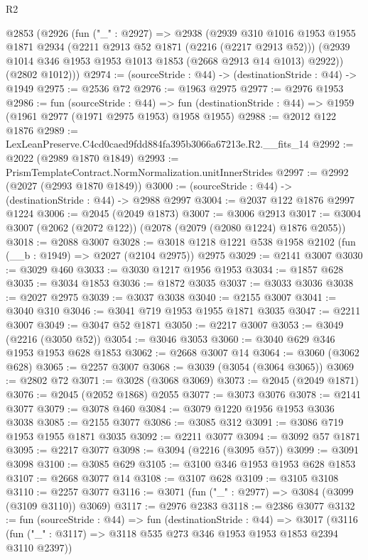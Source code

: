 \begin{lexlean}{R2}
\begin{coremodule}
  @2853
    (@2926
      (fun ("_" : @2927) =>
      @2938
        (@2939
          @310
          @1016
          @1953
          @1955
          @1871
          @2934
          (@2211 @2913 @52 @1871 (@2216 (@2217 @2913 @52)))
          (@2939 @1014 @346 @1953 @1953 @1013 @1853 (@2668 @2913 @14 @1013) @2922))
        (@2802 @1012)))
@2974 := (sourceStride : @44) -> (destinationStride : @44) -> @1949
@2975 := @2536 @72
@2976 := @1963 @2975
@2977 := @2976 @1953
@2986 := fun (sourceStride : @44) =>
  fun (destinationStride : @44) => @1959 (@1961 @2977 (@1971 @2975 @1953) @1958 @1955)
@2988 := @2012 @122 @1876
@2989 := LexLeanPreserve.C4cd0caed9fdd884fa395b3066a67213e.R2.__fits_14
@2992 := @2022 (@2989 @1870 @1849)
@2993 := PrismTemplateContract.NormNormalization.unitInnerStrides
@2997 := @2992 (@2027 (@2993 @1870 @1849))
@3000 := (sourceStride : @44) -> (destinationStride : @44) -> @2988 @2997
@3004 := @2037 @122 @1876 @2997 @1224
@3006 := @2045 (@2049 @1873)
@3007 := @3006 @2913
@3017 := @3004 @3007 (@2062 (@2072 @122)) (@2078 (@2079 (@2080 @1224) @1876 @2055))
@3018 := @2088 @3007
@3028 := @3018 @1218 @1221 @538 @1958 @2102 (fun (__b : @1949) => @2027 (@2104 @2975)) @2975
@3029 := @2141 @3007
@3030 := @3029 @460
@3033 := @3030 @1217 @1956 @1953
@3034 := @1857 @628
@3035 := @3034 @1853
@3036 := @1872 @3035
@3037 := @3033 @3036
@3038 := @2027 @2975
@3039 := @3037 @3038
@3040 := @2155 @3007
@3041 := @3040 @310
@3046 := @3041 @719 @1953 @1955 @1871 @3035
@3047 := @2211 @3007
@3049 := @3047 @52 @1871
@3050 := @2217 @3007
@3053 := @3049 (@2216 (@3050 @52))
@3054 := @3046 @3053
@3060 := @3040 @629 @346 @1953 @1953 @628 @1853
@3062 := @2668 @3007 @14
@3064 := @3060 (@3062 @628)
@3065 := @2257 @3007
@3068 := @3039 (@3054 (@3064 @3065))
@3069 := @2802 @72
@3071 := @3028 (@3068 @3069)
@3073 := @2045 (@2049 @1871)
@3076 := @2045 (@2052 @1868) @2055
@3077 := @3073 @3076
@3078 := @2141 @3077
@3079 := @3078 @460
@3084 := @3079 @1220 @1956 @1953 @3036 @3038
@3085 := @2155 @3077
@3086 := @3085 @312
@3091 := @3086 @719 @1953 @1955 @1871 @3035
@3092 := @2211 @3077
@3094 := @3092 @57 @1871
@3095 := @2217 @3077
@3098 := @3094 (@2216 (@3095 @57))
@3099 := @3091 @3098
@3100 := @3085 @629
@3105 := @3100 @346 @1953 @1953 @628 @1853
@3107 := @2668 @3077 @14
@3108 := @3107 @628
@3109 := @3105 @3108
@3110 := @2257 @3077
@3116 := @3071 (fun ("_" : @2977) => @3084 (@3099 (@3109 @3110)) @3069)
@3117 := @2976 @2383
@3118 := @2386 @3077
@3132 := fun (sourceStride : @44) =>
  fun (destinationStride : @44) =>
  @3017 (@3116 (fun ("_" : @3117) => @3118 @535 @273 @346 @1953 @1953 @1853 @2394 @3110 @2397))

\end{coremodule}
\end{lexlean}
